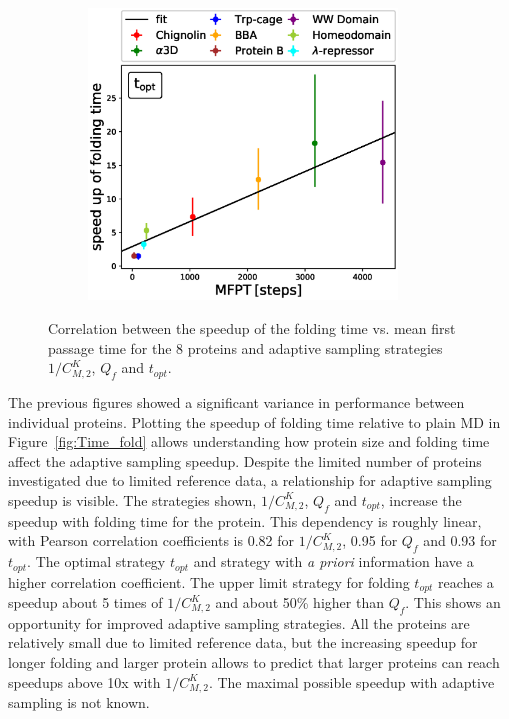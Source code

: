 \begin{figure}[H]
\begin{subfigure}[t]{0.5\textwidth}
    \includegraphics[width=0.9\textwidth]{figures/compare_MD_speed_up_t_opt_6_steps10000_52_0.eps}
  \end{subfigure}
  \caption{Correlation between the speedup of the folding time vs. mean first passage time for the 8 proteins and adaptive sampling strategies $1/C_{M,2}^K$, $Q_f$ and $t_{opt}$.}
  \label{fig:compare-MD-speed-cmacro}
\end{figure}

The previous figures showed a significant variance in performance between individual proteins. Plotting the speedup of folding time relative to plain MD in Figure~\ref{fig:Time_fold} allows understanding how protein size and folding time affect the adaptive sampling speedup. Despite the limited number of proteins investigated due to limited reference data, a relationship for adaptive sampling speedup is visible. The strategies shown, $1/C_{M,2}^K$, $Q_f$ and $t_{opt}$, increase the speedup with folding time for the protein. This dependency is roughly linear, with Pearson correlation coefficients is 0.82 for $1/C_{M,2}^K$, 0.95 for $Q_f$ and 0.93 for $t_{opt}$. The optimal strategy $t_{opt}$ and strategy with \emph{a priori} information have a higher correlation coefficient. The upper limit strategy for folding $t_{opt}$ reaches a speedup about 5 times of $1/C_{M,2}^K$ and about 50\% higher than $Q_f$. This shows an opportunity for improved adaptive sampling strategies. All the proteins are relatively small due to limited reference data, but the increasing speedup for longer folding and larger protein allows to predict that larger proteins can reach speedups above 10x with $1/C_{M,2}^K$. The maximal possible speedup with adaptive sampling is not known. 

